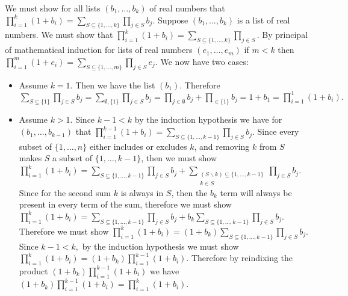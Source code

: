 \documentclass[12pt, letterpaper]{article}
\newcommand{\Po}{\mathcal{P}}
\begin{document}
We must show for all lists $(b_1,\ldots,b_k)$ of real numbers that $\prod_{i=1}^k (1+b_i)=\sum_{S \subseteq \{1,\ldots,k\}} \prod_{j \in S} b_j$.  Suppose $(b_1,\ldots,b_k)$ is a list of real numbers.  We must show that $\prod_{i=1}^k (1+b_i)=\sum_{S \subseteq \{1,\ldots,k\}} \prod_{j \in S}$.  By principal of mathematical induction for lists of real numbers $(e_1,\ldots,e_m)$ if $m < k$ then  $\prod_{i=1}^{m} (1+e_i)=\sum_{S \subseteq \{1,\ldots,m\}} \prod_{j \in S} e_j$.  We now have two cases:
\begin{itemize}
	\item Assume $k=1$.  Then we have the list $(b_1).$  Therefore $\sum_{S \subseteq \{1\}} \prod_{j \in S} b_j = \sum_{\emptyset,\{1\}} \prod_{j \in S} b_j = \prod_{j \in \emptyset} b_j + \prod_{ \in \{1\}} b_j = 1 + b_1 = \prod_{i=1}^1 (1+b_i).$
	\item Assume $k > 1.$  Since $k -1 < k$ by the induction hypothesis we have for $(b_1,\ldots,b_{k-1})$ that $\prod_{i=1}^{k-1} (1+b_i)=\sum_{S \subseteq \{1,\ldots,k-1\}} \prod_{j \in S} b_j$.  Since every subset of $\{1,\ldots,n\}$ either includes or excludes $k$, and removing $k$ from $S$ makes $S$ a subset of $\{1,\ldots,k-1\}$, then we must show $\prod_{i=1}^k (1+b_i)=\sum_{S \subseteq \{1,\ldots,k-1\}} \prod_{j \in S} b_j + \sum_{\substack{(S\backslash k) \subseteq \{1,\ldots,k-1\}\\{k \in S}}} \prod_{j \in S} b_j$.  Since for the second sum $k$ is always in $S$, then the $b_k$ term will always be present in every term of the sum, therefore we must show $\prod_{i=1}^k (1+b_i)=\sum_{S \subseteq \{1,\ldots,k-1\}} \prod_{j \in S} b_j + b_k \sum_{S \subseteq \{1,\ldots,k-1\}} \prod_{j \in S} b_j$.  Therefore we must show $\prod_{i=1}^k (1+b_i)=(1+b_k)\sum_{S \subseteq \{1,\ldots,k-1\}} \prod_{j \in S} b_j$.  Since $k-1 < k,$ by the induction hypothesis we must show $\prod_{i=1}^k (1+b_i)=(1+b_k)\prod_{i=1}^{k-1} (1+b_i).$  Therefore by reindixing the product $(1+b_k)\prod_{i=1}^{k-1} (1+b_i)$ we have $(1+b_k)\prod_{i=1}^{k-1} (1+b_i) = \prod_{i=1}^k (1+b_i).$
	\iffalse By definition of the power set we must show $\prod_{i=1}^k (1+b_i)=\sum_{S \in \Po([k])} \prod_{j \in S} b_j$.  By the lemma above we must show $\prod_{i=1}^k (1+b_i)=\sum_{S \in \Po([k-1]) \cup (\{k\} \cup \Po([k-1]))} \prod_{j \in S} b_j$.  Therefore we must show $\prod_{i=1}^k (1+b_i)=\sum_{S \in \Po([k-1])}\prod_{j \in S} b_j +\sum_{(\{k\} \cup \Po([k-1]))} \prod_{j \in S} b_j = $
	\fi
\end{itemize}
\end{document}
